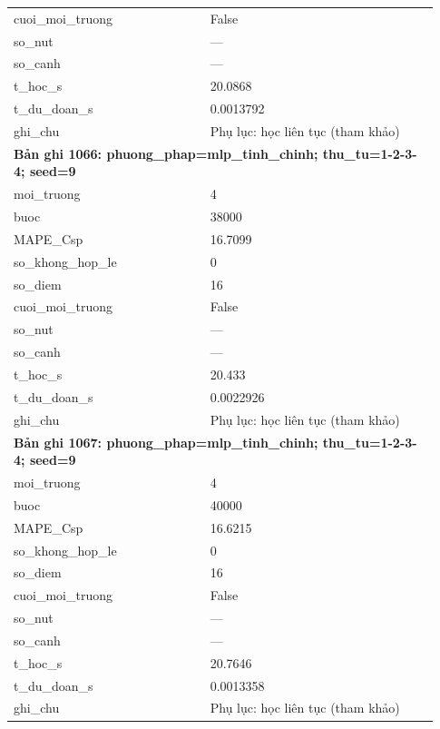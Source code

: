 \begin{longtable}{p{0.43\linewidth}p{0.50\linewidth}}
cuoi\_\allowbreak moi\_\allowbreak truong & False \\
so\_\allowbreak nut & — \\
so\_\allowbreak canh & — \\
t\_\allowbreak hoc\_\allowbreak s & 20.0868 \\
t\_\allowbreak du\_\allowbreak doan\_\allowbreak s & 0.0013792 \\
ghi\_\allowbreak chu & Phụ lục: học liên tục (tham khảo) \\
\midrule
\multicolumn{2}{p{0.95\linewidth}}{\textbf{Bản ghi 1066: phuong\_phap=mlp\_tinh\_chinh; thu\_tu=1-2-3-4; seed=9}} \\
moi\_\allowbreak truong & 4 \\
buoc & 38000 \\
MAPE\_\allowbreak Csp & 16.7099 \\
so\_\allowbreak khong\_\allowbreak hop\_\allowbreak le & 0 \\
so\_\allowbreak diem & 16 \\
cuoi\_\allowbreak moi\_\allowbreak truong & False \\
so\_\allowbreak nut & — \\
so\_\allowbreak canh & — \\
t\_\allowbreak hoc\_\allowbreak s & 20.433 \\
t\_\allowbreak du\_\allowbreak doan\_\allowbreak s & 0.0022926 \\
ghi\_\allowbreak chu & Phụ lục: học liên tục (tham khảo) \\
\midrule
\multicolumn{2}{p{0.95\linewidth}}{\textbf{Bản ghi 1067: phuong\_phap=mlp\_tinh\_chinh; thu\_tu=1-2-3-4; seed=9}} \\
moi\_\allowbreak truong & 4 \\
buoc & 40000 \\
MAPE\_\allowbreak Csp & 16.6215 \\
so\_\allowbreak khong\_\allowbreak hop\_\allowbreak le & 0 \\
so\_\allowbreak diem & 16 \\
cuoi\_\allowbreak moi\_\allowbreak truong & False \\
so\_\allowbreak nut & — \\
so\_\allowbreak canh & — \\
t\_\allowbreak hoc\_\allowbreak s & 20.7646 \\
t\_\allowbreak du\_\allowbreak doan\_\allowbreak s & 0.0013358 \\
ghi\_\allowbreak chu & Phụ lục: học liên tục (tham khảo) \\

\end{longtable}
